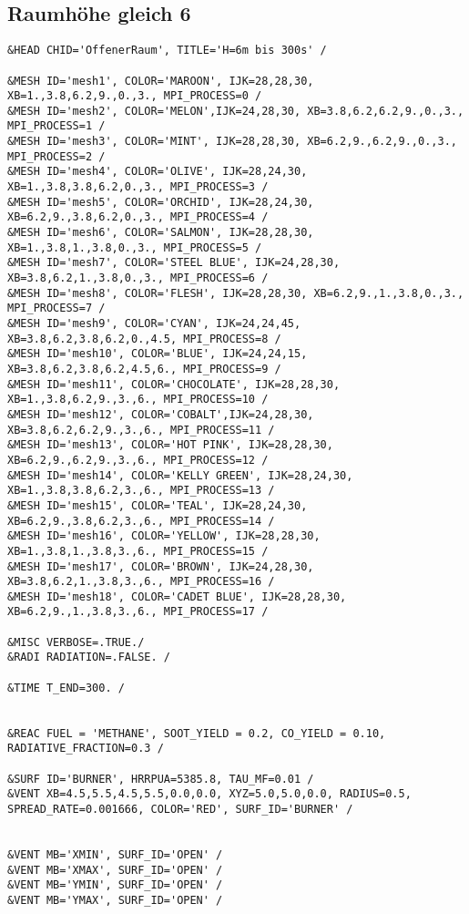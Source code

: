 \subsection*{Raumhöhe gleich 6}
\begin{lstlisting}[emptylines=0,basicstyle=\tiny]
&HEAD CHID='OffenerRaum', TITLE='H=6m bis 300s' /

&MESH ID='mesh1', COLOR='MAROON', IJK=28,28,30, XB=1.,3.8,6.2,9.,0.,3., MPI_PROCESS=0 /
&MESH ID='mesh2', COLOR='MELON',IJK=24,28,30, XB=3.8,6.2,6.2,9.,0.,3., MPI_PROCESS=1 /
&MESH ID='mesh3', COLOR='MINT', IJK=28,28,30, XB=6.2,9.,6.2,9.,0.,3., MPI_PROCESS=2 /
&MESH ID='mesh4', COLOR='OLIVE', IJK=28,24,30, XB=1.,3.8,3.8,6.2,0.,3., MPI_PROCESS=3 /
&MESH ID='mesh5', COLOR='ORCHID', IJK=28,24,30, XB=6.2,9.,3.8,6.2,0.,3., MPI_PROCESS=4 /
&MESH ID='mesh6', COLOR='SALMON', IJK=28,28,30, XB=1.,3.8,1.,3.8,0.,3., MPI_PROCESS=5 /
&MESH ID='mesh7', COLOR='STEEL BLUE', IJK=24,28,30, XB=3.8,6.2,1.,3.8,0.,3., MPI_PROCESS=6 /
&MESH ID='mesh8', COLOR='FLESH', IJK=28,28,30, XB=6.2,9.,1.,3.8,0.,3., MPI_PROCESS=7 /
&MESH ID='mesh9', COLOR='CYAN', IJK=24,24,45, XB=3.8,6.2,3.8,6.2,0.,4.5, MPI_PROCESS=8 /
&MESH ID='mesh10', COLOR='BLUE', IJK=24,24,15, XB=3.8,6.2,3.8,6.2,4.5,6., MPI_PROCESS=9 /
&MESH ID='mesh11', COLOR='CHOCOLATE', IJK=28,28,30, XB=1.,3.8,6.2,9.,3.,6., MPI_PROCESS=10 /
&MESH ID='mesh12', COLOR='COBALT',IJK=24,28,30, XB=3.8,6.2,6.2,9.,3.,6., MPI_PROCESS=11 /
&MESH ID='mesh13', COLOR='HOT PINK', IJK=28,28,30, XB=6.2,9.,6.2,9.,3.,6., MPI_PROCESS=12 /
&MESH ID='mesh14', COLOR='KELLY GREEN', IJK=28,24,30, XB=1.,3.8,3.8,6.2,3.,6., MPI_PROCESS=13 /
&MESH ID='mesh15', COLOR='TEAL', IJK=28,24,30, XB=6.2,9.,3.8,6.2,3.,6., MPI_PROCESS=14 /
&MESH ID='mesh16', COLOR='YELLOW', IJK=28,28,30, XB=1.,3.8,1.,3.8,3.,6., MPI_PROCESS=15 /
&MESH ID='mesh17', COLOR='BROWN', IJK=24,28,30, XB=3.8,6.2,1.,3.8,3.,6., MPI_PROCESS=16 /
&MESH ID='mesh18', COLOR='CADET BLUE', IJK=28,28,30, XB=6.2,9.,1.,3.8,3.,6., MPI_PROCESS=17 /

&MISC VERBOSE=.TRUE./
&RADI RADIATION=.FALSE. /

&TIME T_END=300. /


&REAC FUEL = 'METHANE', SOOT_YIELD = 0.2, CO_YIELD = 0.10, RADIATIVE_FRACTION=0.3 /

&SURF ID='BURNER', HRRPUA=5385.8, TAU_MF=0.01 /
&VENT XB=4.5,5.5,4.5,5.5,0.0,0.0, XYZ=5.0,5.0,0.0, RADIUS=0.5, SPREAD_RATE=0.001666, COLOR='RED', SURF_ID='BURNER' /


&VENT MB='XMIN', SURF_ID='OPEN' /  
&VENT MB='XMAX', SURF_ID='OPEN' /  
&VENT MB='YMIN', SURF_ID='OPEN' /  
&VENT MB='YMAX', SURF_ID='OPEN' / 


\end{lstlisting}
